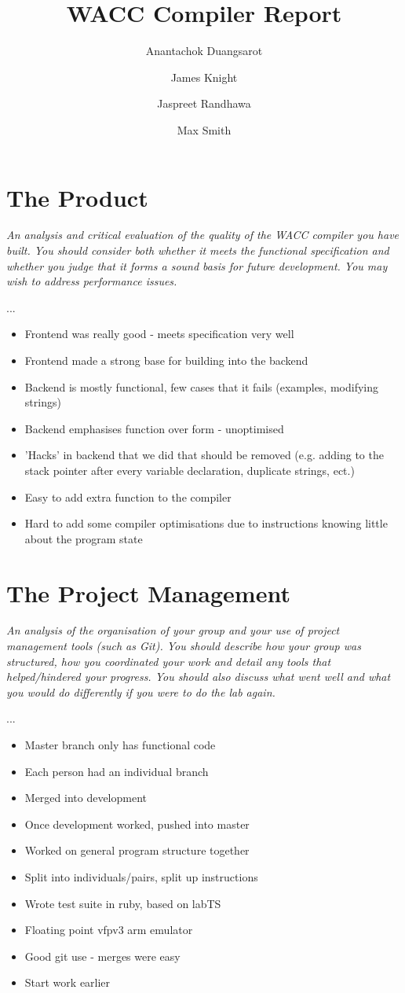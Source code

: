 \documentclass[]{article}
\date{\displaydate{date}}
\title{WACC Compiler Report}
\author{
	Anantachok Duangsarot \\
	\and
	James Knight \\
	\and
	Jaspreet Randhawa \\
	\and
	Max Smith \\
}
\newcommand{\spec}[1]{\textit{#1}\par\noindent}
\begin{document}
\maketitle

\section{The Product}
\spec{An analysis and critical evaluation of the quality of the WACC compiler you have built. You should consider both whether it meets the functional specification and whether you judge that it forms a sound basis for future development. You may wish to address performance issues.}
...
\begin{itemize}
\item Frontend was really good - meets specification very well
\item Frontend made a strong base for building into the backend
\item Backend is mostly functional, few cases that it fails (examples, modifying strings)
\item Backend emphasises function over form - unoptimised
\item 'Hacks' in backend that we did that should be removed (e.g. adding to the stack pointer after every variable declaration, duplicate strings, ect.)
\item Easy to add extra function to the compiler
\item Hard to add some compiler optimisations due to instructions knowing little about the program state
\end{itemize}

\section{The Project Management}
\spec{An analysis of the organisation of your group and your use of project management tools (such as Git). You should describe how your group was structured, how you coordinated your work and detail any tools that helped/hindered your progress. You should also discuss what went well and what you would do differently if you were to do the lab again.}
...
\begin{itemize}
\item Master branch only has functional code
\item Each person had an individual branch
\item Merged into development
\item Once development worked, pushed into master
\item Worked on general program structure together
\item Split into individuals/pairs, split up instructions
\item Wrote test suite in ruby, based on labTS
\item Floating point vfpv3 arm emulator
\item Good git use - merges were easy
\item Start work earlier
\end{itemize}
\end{document}
